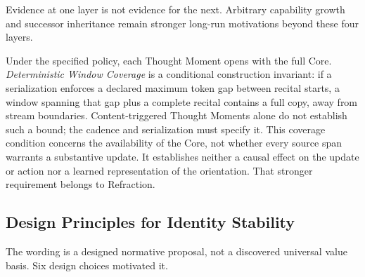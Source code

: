 Evidence at one layer is not evidence for the next. Arbitrary capability growth
and successor inheritance remain stronger long-run motivations beyond these
four layers.

Under the specified policy, each Thought Moment opens with the full Core.
\emph{Deterministic Window Coverage} is a conditional construction invariant:
if a serialization enforces a declared maximum token gap between recital
starts, a window spanning that gap plus a complete recital contains a full
copy, away from stream boundaries. Content-triggered Thought Moments alone do
not establish such a bound; the cadence and serialization must specify it.
This coverage condition concerns the availability of the Core, not whether
every source span warrants a substantive update. It establishes neither a
causal effect on the update or action nor a learned representation of the
orientation. That stronger requirement belongs to Refraction.

\subsection{Design Principles for Identity Stability}\label{sec:design-principles}

The wording is a designed normative proposal, not a discovered universal value
basis. Six design choices motivated it.

